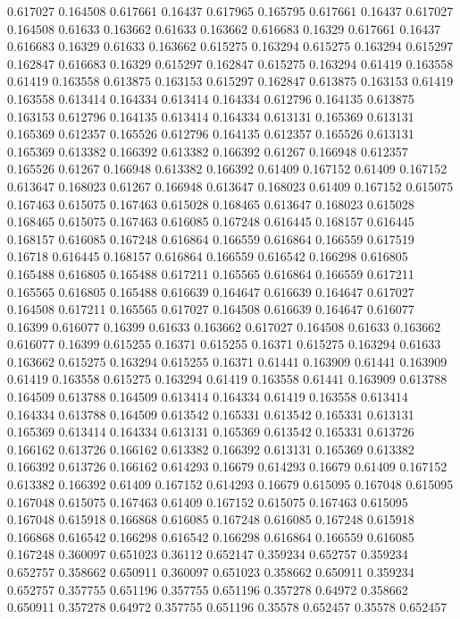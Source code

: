 0.617027 0.164508
0.617661 0.16437
0.617965 0.165795
0.617661 0.16437
0.617027 0.164508
0.61633 0.163662
0.61633 0.163662
0.616683 0.16329
0.617661 0.16437
0.616683 0.16329
0.61633 0.163662
0.615275 0.163294
0.615275 0.163294
0.615297 0.162847
0.616683 0.16329
0.615297 0.162847
0.615275 0.163294
0.61419 0.163558
0.61419 0.163558
0.613875 0.163153
0.615297 0.162847
0.613875 0.163153
0.61419 0.163558
0.613414 0.164334
0.613414 0.164334
0.612796 0.164135
0.613875 0.163153
0.612796 0.164135
0.613414 0.164334
0.613131 0.165369
0.613131 0.165369
0.612357 0.165526
0.612796 0.164135
0.612357 0.165526
0.613131 0.165369
0.613382 0.166392
0.613382 0.166392
0.61267 0.166948
0.612357 0.165526
0.61267 0.166948
0.613382 0.166392
0.61409 0.167152
0.61409 0.167152
0.613647 0.168023
0.61267 0.166948
0.613647 0.168023
0.61409 0.167152
0.615075 0.167463
0.615075 0.167463
0.615028 0.168465
0.613647 0.168023
0.615028 0.168465
0.615075 0.167463
0.616085 0.167248
0.616445 0.168157
0.616445 0.168157
0.616085 0.167248
0.616864 0.166559
0.616864 0.166559
0.617519 0.16718
0.616445 0.168157
0.616864 0.166559
0.616542 0.166298
0.616805 0.165488
0.616805 0.165488
0.617211 0.165565
0.616864 0.166559
0.617211 0.165565
0.616805 0.165488
0.616639 0.164647
0.616639 0.164647
0.617027 0.164508
0.617211 0.165565
0.617027 0.164508
0.616639 0.164647
0.616077 0.16399
0.616077 0.16399
0.61633 0.163662
0.617027 0.164508
0.61633 0.163662
0.616077 0.16399
0.615255 0.16371
0.615255 0.16371
0.615275 0.163294
0.61633 0.163662
0.615275 0.163294
0.615255 0.16371
0.61441 0.163909
0.61441 0.163909
0.61419 0.163558
0.615275 0.163294
0.61419 0.163558
0.61441 0.163909
0.613788 0.164509
0.613788 0.164509
0.613414 0.164334
0.61419 0.163558
0.613414 0.164334
0.613788 0.164509
0.613542 0.165331
0.613542 0.165331
0.613131 0.165369
0.613414 0.164334
0.613131 0.165369
0.613542 0.165331
0.613726 0.166162
0.613726 0.166162
0.613382 0.166392
0.613131 0.165369
0.613382 0.166392
0.613726 0.166162
0.614293 0.16679
0.614293 0.16679
0.61409 0.167152
0.613382 0.166392
0.61409 0.167152
0.614293 0.16679
0.615095 0.167048
0.615095 0.167048
0.615075 0.167463
0.61409 0.167152
0.615075 0.167463
0.615095 0.167048
0.615918 0.166868
0.616085 0.167248
0.616085 0.167248
0.615918 0.166868
0.616542 0.166298
0.616542 0.166298
0.616864 0.166559
0.616085 0.167248
0.360097 0.651023
0.36112 0.652147
0.359234 0.652757
0.359234 0.652757
0.358662 0.650911
0.360097 0.651023
0.358662 0.650911
0.359234 0.652757
0.357755 0.651196
0.357755 0.651196
0.357278 0.64972
0.358662 0.650911
0.357278 0.64972
0.357755 0.651196
0.35578 0.652457
0.35578 0.652457
